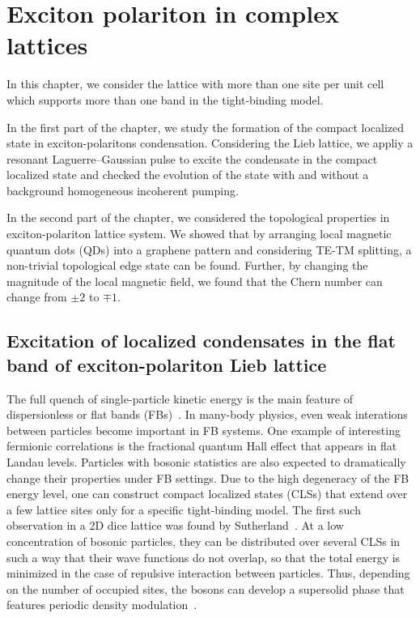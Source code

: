 \chapter{Exciton polariton in complex lattices}\label{CHTHREE}
In this chapter, we consider the lattice with more than one site per unit cell which supports more than one band in the tight-binding model.

In the first part of the chapter, we study the formation of the compact localized state in exciton-polaritons condensation. Considering the Lieb lattice, we appliy a resonant Laguerre--Gaussian pulse to excite the condensate in the compact localized state and checked the evolution of the state with and without a background homogeneous incoherent pumping.

In the second part of the chapter, we considered the topological properties in exciton-polariton lattice system. We showed that by arranging local magnetic quantum dots (QDs) into a graphene pattern and considering TE-TM splitting, a non-trivial topological edge state can be found.
Further, by changing the magnitude of the local magnetic field, we found that the Chern number can change from $\pm 2$ to $\mp 1$.

\section{Excitation of localized condensates in the flat band of exciton-polariton Lieb lattice}\label{Ch4}
The full quench of single-particle kinetic energy is the main feature of dispersionless or flat bands (FBs)~\cite{Derzhko:2015aa,Leykam:2018aa,Leykam:2018ab}.
In many-body physics, even weak interations between particles become important in FB systems.
One example of interesting fermionic correlations is the fractional quantum Hall effect that appears in flat Landau levels.
Particles with bosonic statistics are also expected to dramatically change their properties under FB settings.
Due to the high degeneracy of the FB energy level, one can construct compact localized states (CLSs) that extend over a few lattice sites only for a specific tight-binding model.
The first such observation in a 2D dice lattice was found by Sutherland~\cite{Sutherland:1986aa}.
At a low concentration of bosonic particles, they can be distributed over several CLSs in such a way that their wave functions do not overlap, so that the total energy is minimized in the case of repulsive interaction between particles.
Thus, depending on the number of occupied sites, the bosons can develop a supersolid phase that features periodic density modulation~\cite{Huber:2010aa}.

